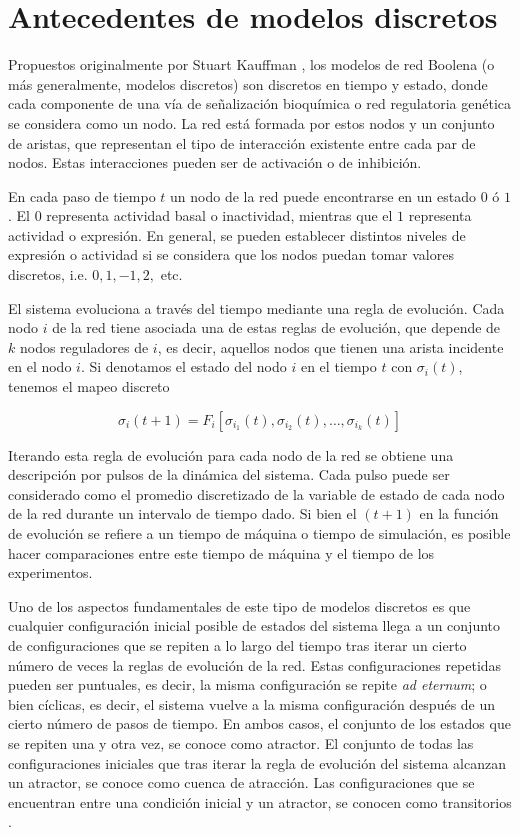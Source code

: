\section{Antecedentes de modelos discretos}

Propuestos originalmente por Stuart Kauffman \citeauthor{Kauffman:1969up} \citep{Kauffman:1969up}, los modelos de red Boolena (o más generalmente, modelos discretos) son discretos en tiempo y estado, donde cada componente de una vía de señalización  bioquímica o red regulatoria genética se considera como un nodo. La red está formada por estos nodos y un conjunto de aristas, que representan el tipo de interacción existente entre cada par de nodos. Estas interacciones pueden ser de activación o de inhibición. 

En cada paso de tiempo $t$ un nodo de la red puede encontrarse en un estado $0$ ó $1$. El $0$ representa actividad basal o inactividad, mientras que el $1$ representa actividad o expresión. En general, se pueden establecer distintos niveles de expresión o actividad si se considera que los nodos puedan tomar valores discretos, i.e. $0, 1, -1, 2,$ etc.

El sistema evoluciona a través del tiempo mediante una regla de evolución. Cada nodo $i$ de la red tiene asociada una de estas reglas de evolución,  que depende de $k$ nodos reguladores de $i$, es decir, aquellos nodos que tienen una arista incidente en el nodo $i$. Si denotamos el estado del nodo $i$ en el tiempo $t$ con $\sigma_i(t)$, tenemos el mapeo discreto

\begin{equation}\label{eqn:kaufman}
\sigma_i(t+1) = F_i[\sigma_{i_1}(t), \sigma_{i_2}(t),\ldots, \sigma_{i_k}(t)]
\end{equation}

Iterando esta regla de evolución para cada nodo de la red se obtiene una descripción por pulsos de la dinámica del sistema. Cada pulso puede ser considerado como el promedio discretizado de la variable de estado de cada nodo de la red durante un intervalo de tiempo dado. Si bien el $(t+1)$ en la función de evolución se refiere a un tiempo de máquina o tiempo de simulación, es posible hacer comparaciones entre este tiempo de máquina y el tiempo de los experimentos.

Uno de los aspectos fundamentales de este tipo de modelos discretos es que cualquier configuración inicial posible de estados del sistema llega a un conjunto de configuraciones que se repiten a lo largo del tiempo tras iterar un cierto número de veces la reglas de evolución de la red. Estas configuraciones repetidas pueden ser puntuales, es decir, la misma configuración se repite \emph{ad eternum}; o bien cíclicas, es decir, el sistema vuelve a la misma configuración después de un cierto número de pasos de tiempo. En ambos casos, el conjunto de los estados que se repiten una y otra vez, se conoce como atractor. El conjunto de todas las configuraciones iniciales que tras iterar la regla de evolución del sistema alcanzan un atractor, se conoce como cuenca de atracción. Las configuraciones que se encuentran entre una condición inicial y un atractor, se conocen como transitorios \citeauthor{Bornholdt:2005hg} \citep{Bornholdt:2005hg}.


